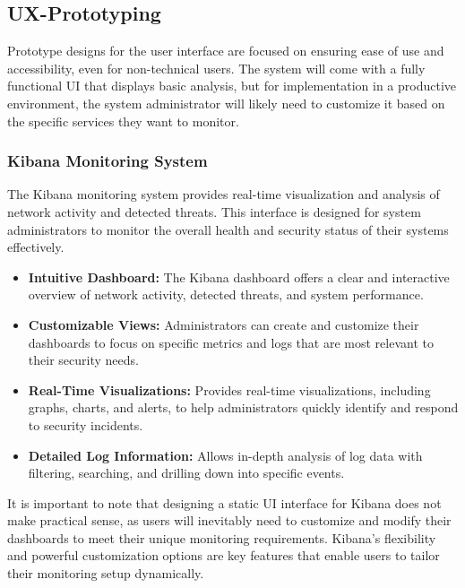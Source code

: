 \documentclass{article}
\begin{document}
    \subsection{UX-Prototyping}\label{subsec:ux-prototyping}

    Prototype designs for the user interface are focused on ensuring ease of use and accessibility, even for non-technical users.
    The system will come with a fully functional UI that displays basic analysis, but for implementation in a productive environment, the system administrator will likely need to customize it based on the specific services they want to monitor.

    \subsubsection{Kibana Monitoring System}\label{subsubsec:kibana-monitoring-system}

    The Kibana monitoring system provides real-time visualization and analysis of network activity and detected threats.
    This interface is designed for system administrators to monitor the overall health and security status of their systems effectively.

    \begin{itemize}
        \item \textbf{Intuitive Dashboard:} The Kibana dashboard offers a clear and interactive overview of network activity, detected threats, and system performance.
        \item \textbf{Customizable Views:} Administrators can create and customize their dashboards to focus on specific metrics and logs that are most relevant to their security needs.
        \item \textbf{Real-Time Visualizations:} Provides real-time visualizations, including graphs, charts, and alerts, to help administrators quickly identify and respond to security incidents.
        \item \textbf{Detailed Log Information:} Allows in-depth analysis of log data with filtering, searching, and drilling down into specific events.
    \end{itemize}

    \noindent  It is important to note that designing a static UI interface for Kibana does not make practical sense, as users will inevitably need to customize and modify their dashboards to meet their unique monitoring requirements.
    Kibana’s flexibility and powerful customization options are key features that enable users to tailor their monitoring setup dynamically.
\end{document}
